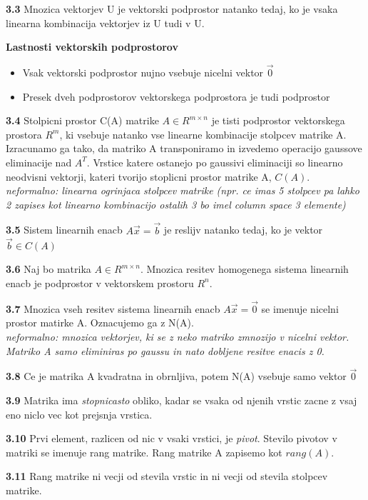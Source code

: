 \documentclass{article}
\begin{document}
\begin{multicols}{4}
	\textbf{3.3} Mnozica vektorjev U je vektorski podprostor natanko tedaj, ko je vsaka linearna
	kombinacija vektorjev iz U tudi v U.

	\textbf{Lastnosti vektorskih podprostorov}
	\begin{itemize}
		\item Vsak vektorski podprostor nujno vsebuje nicelni vektor $\vec{0}$
		\item Presek dveh podprostorov vektorskega podprostora je tudi podprostor
	\end{itemize}

	\textbf{3.4} Stolpicni prostor C(A) matrike $A \in R^{m \times n}$ je tisti podprostor
	vektorskega prostora $R^{m}$, ki vsebuje natanko vse linearne kombinacije stolpcev matrike A.\\
	Izracunamo ga tako, da matriko A transponiramo in izvedemo operacijo gaussove eliminacije nad $A^{T}$. Vrstice katere ostanejo po gaussivi eliminaciji
	so linearno neodvisni vektorji, kateri tvorijo stoplicni prostor matrike A, $C(A)$.
	\textit{neformalno: linearna ogrinjaca stolpcev matrike (npr. ce imas 5 stolpcev pa lahko 2 zapises kot linearno kombinacijo ostalih 3 bo imel column space 3 elemente)}

	\textbf{3.5} Sistem linearnih enacb $A\vec{x} = \vec{b}$ je reslijv natanko tedaj, ko je vektor
	$\vec{b} \in C(A)$

	\textbf{3.6} Naj bo matrika $A \in R^{m \times n}$. Mnozica resitev homogenega sistema linearnih
	enacb je podprostor v vektorskem prostoru $R^{n}$.

	\textbf{3.7} Mnozica vseh resitev sistema linearnih enacb $A\vec{x} = \vec{0}$ se imenuje nicelni
	prostor matirke A. Oznacujemo ga z N(A).\\
	\textit{neformalno: mnozica vektorjev, ki se z neko matriko zmnozijo v nicelni vektor. Matriko A samo eliminiras po gaussu in nato dobljene resitve enacis z 0.}

	\textbf{3.8} Ce je matrika A kvadratna in obrnljiva, potem N(A) vsebuje samo vektor $\vec{0}$

	\textbf{3.9} Matrika ima \textit{stopnicasto} obliko, kadar se vsaka od njenih vrstic zacne z vsaj eno
	niclo vec kot prejsnja vrstica.

	\textbf{3.10} Prvi element, razlicen od nic v vsaki vrstici, je \textit{pivot}. Stevilo pivotov v matriki
	se imenuje rang matrike. Rang matrike A zapisemo kot $rang(A)$.

	\textbf{3.11} Rang matrike ni vecji od stevila vrstic in ni vecji od stevila stolpcev matrike.


\end{multicols}
\end{document}
